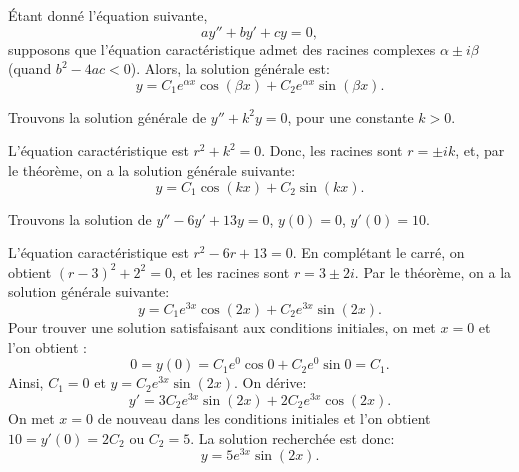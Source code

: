 \begin{theorem}
	Étant donné l'équation suivante,
	\begin{equation*}
		ay'' + by' + cy = 0,  
	\end{equation*}
	supposons que l'équation caractéristique admet des racines complexes $\alpha \pm i \beta$
	(quand $b^2 - 4ac < 0$).
	Alors, la solution générale est: 
	\begin{equation*}
		y = C_1 e^{\alpha x} \cos (\beta x) + C_2 e^{\alpha x} \sin (\beta x) .
	\end{equation*}
\end{theorem}

\begin{example} \label{example:sincossecondorder}
	Trouvons la solution générale de $y'' + k^2 y = 0$, pour une constante  $k > 0$.
	
	L'équation caractéristique est  $r^2 + k^2 = 0$.  
	Donc, les racines sont $r = \pm ik$, et, par le théorème, on a la solution générale  suivante:
	\begin{equation*}
		y = C_1 \cos (kx) + C_2 \sin (kx) .
	\end{equation*}
\end{example}

\begin{example}
	Trouvons la solution de  $y'' - 6 y' + 13 y = 0$, $y(0) = 0$, $y'(0) = 10$.
	
	L'équation caractéristique est  $r^2 - 6 r + 13 = 0$. 
	En complétant le carré, on obtient   ${(r-3)}^2 + 2^2 = 0$, et les racines sont
	$r = 3 \pm 2i$.
	Par le théorème, on a la solution générale suivante:
	\begin{equation*}
		y = C_1 e^{3x} \cos (2x) + C_2 e^{3x} \sin (2x) .
	\end{equation*}
	Pour trouver une solution satisfaisant aux conditions initiales, on met $x=0$ et l'on obtient :
	\begin{equation*}
		0 = y(0) = C_1 e^{0} \cos 0 + C_2 e^{0} \sin 0  = C_1 .
	\end{equation*}
	Ainsi, $C_1 = 0$ et $y = C_2 e^{3x} \sin (2x)$.  On dérive: 
	\begin{equation*}
		y' = 3C_2 e^{3x} \sin (2x) + 2C_2 e^{3x} \cos (2x) .
	\end{equation*}
	On met $x=0$ de nouveau dans les conditions initiales et l'on obtient  $10 = y'(0) = 2C_2$ ou
	$C_2 = 5$.  La solution recherchée est donc:
	\begin{equation*}
		y = 5 e^{3x} \sin (2x) .
	\end{equation*}
\end{example}

